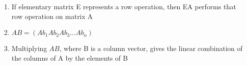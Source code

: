 \documentclass{article}
\begin{document}
\begin{enumerate}

\item If elementary matrix E represents a row operation, then EA performs 
that row operation on matrix A

\item $AB = (Ab_1 Ab_2 Ab_3 ... Ab_n)$

\item Multiplying $AB$, where B is a column vector, gives the linear combination
of the columns of A by the elements of B

\end{enumerate}
\end{document}
